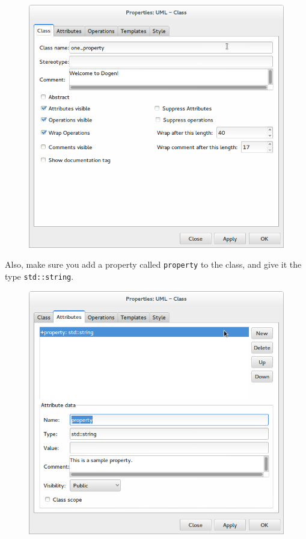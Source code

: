 \documentclass{book}
\begin{document}
\begin{figure}[H]
    \centering
    \includegraphics[scale=0.4]{images/dia_hello_world_class.png}
    \caption{}
\end{figure}

Also, make sure you add a property called \texttt{property} to the
class, and give it the type \texttt{std::string}.

\begin{figure}[H]
    \centering
    \includegraphics[scale=0.4]{images/dia_hello_world_attributes.png}
    \caption{}
\end{figure}
\end{document}
